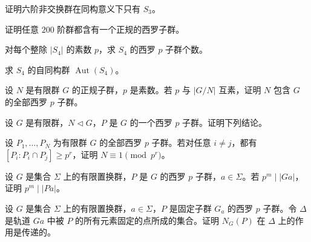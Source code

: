 \newpage
\noindent\begin{minipage}{\textwidth}
证明六阶非交换群在同构意义下只有 $S_3$。
\end{minipage}\par\vfill
\noindent\begin{minipage}{\textwidth}
证明任意 $200$ 阶群都含有一个正规的西罗子群。
\end{minipage}\par\vfill
\noindent\begin{minipage}{\textwidth}
对每个整除 $|S_4|$ 的素数 $p$，求 $S_4$ 的西罗 $p$ 子群个数。
\end{minipage}\par\vfill
\newpage
\noindent\begin{minipage}{\textwidth}
求 $S_4$ 的自同构群 $\operatorname{Aut}(S_4)$。
\end{minipage}\par\vfill
\noindent\begin{minipage}{\textwidth}
设 $N$ 是有限群 $G$ 的正规子群，$p$ 是素数。若 $p$ 与 $|G/N|$ 互素，证明 $N$ 包含 $G$ 的全部西罗 $p$ 子群。
\end{minipage}\par\vfill
\noindent\begin{minipage}{\textwidth}
设 $G$ 是有限群，$N\triangleleft G$，$P$ 是 $G$ 的一个西罗 $p$ 子群。证明下列结论。
\end{minipage}\par\vfill
\newpage
\noindent\begin{minipage}{\textwidth}
设 $P_1,\ldots,P_N$ 为有限群 $G$ 的全部西罗 $p$ 子群。若对任意 $i\ne j$，都有 $[P_i:P_i\cap P_j]\ge p^r$，证明 $N\equiv1\pmod{p^r}$。
\end{minipage}\par\vfill
\noindent\begin{minipage}{\textwidth}
设 $G$ 是集合 $\Sigma$ 上的有限置换群，$P$ 是 $G$ 的西罗 $p$ 子群，$a\in\Sigma$。若 $p^m\mid |Ga|$，证明 $p^m\mid |Pa|$。
\end{minipage}\par\vfill
\noindent\begin{minipage}{\textwidth}
设 $G$ 是集合 $\Sigma$ 上的有限置换群，$a\in\Sigma$，$P$ 是固定子群 $G_a$ 的西罗 $p$ 子群。令 $\Delta$ 是轨道 $Ga$ 中被 $P$ 的所有元素固定的点所成的集合。证明 $N_G(P)$ 在 $\Delta$ 上的作用是传递的。
\end{minipage}\par\vfill
